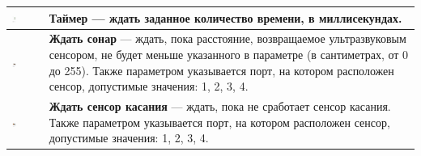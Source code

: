 \documentclass[a4paper,12pt,twoside]{article}
\begin{document}
\begin{center}
\begin{tabular}{m{} | m{}}
    {\vspace{10pt}\includegraphics[width=0.15\textwidth]{Delay.png}}         & \textbf{Таймер} --- ждать заданное количество времени, в миллисекундах. \\ \hline
    {\vspace{10pt}\includegraphics[width=0.15\textwidth]{WaitForSonar.png}}  & \textbf{Ждать сонар} --- ждать, пока расстояние, возвращаемое ультразвуковым сенсором, не будет меньше указанного в параметре (в сантиметрах, от 0 до 255). Также параметром указывается порт, на котором расположен сенсор, допустимые значения: 1, 2, 3, 4. \\ \hline
    {\vspace{10pt}\includegraphics[width=0.15\textwidth]{WaitForTouch.png}}  & \textbf{Ждать сенсор касания} --- ждать, пока не сработает сенсор касания. Также параметром указывается порт, на котором расположен сенсор, допустимые значения: 1, 2, 3, 4. \\ \hline
	\end{tabular}
\end{center}
\end{document}
